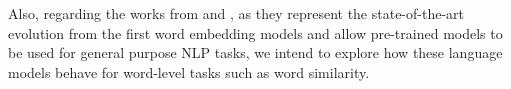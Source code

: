 Also, regarding the works from  and , as they represent the state-of-the-art evolution from the first word embedding models and allow pre-trained models to be used for general purpose NLP tasks, we intend to explore how these language models behave for word-level tasks such as word similarity.

% 








